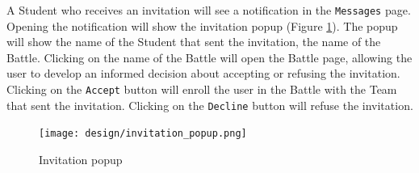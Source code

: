 A Student who receives an invitation will see a notification in the \verb|Messages| page.
Opening the notification will show the invitation popup (Figure \ref{fig: invitation_popup}).
The popup will show the name of the Student that sent the invitation, the name of the Battle.
Clicking on the name of the Battle will open the Battle page, allowing the user to develop an informed decision about accepting or refusing the invitation.
Clicking on the \verb|Accept| button will enroll the user in the Battle with the Team that sent the invitation.
Clicking on the \verb|Decline| button will refuse the invitation.
\begin{figure} [H]
    \begin{center}
        \texttt{[image: design/invitation\_popup.png]}
        \caption{Invitation popup}
        \label{fig: invitation_popup}
    \end{center}
\end{figure}









